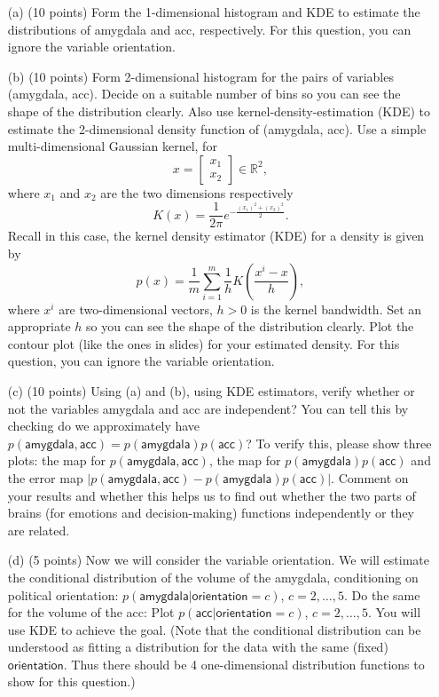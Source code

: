 \documentclass[twoside,12pt]{article}
\begin{document}
 \begin{enumerate}
 
 
 \item[(a)] (10 points) Form the 1-dimensional histogram and KDE to estimate the distributions of \textsf{amygdala} and \textsf{acc}, respectively. For this question, you can ignore the variable \textsf{orientation}.
 
 
 \item[(b)] (10 points) Form 2-dimensional histogram for the pairs of variables (\textsf{amygdala}, \textsf{acc}). Decide on a suitable number of bins so you can see the shape of the distribution clearly. Also use kernel-density-estimation (KDE) to estimate the 2-dimensional density function of (\textsf{amygdala}, \textsf{acc}). Use a simple multi-dimensional Gaussian kernel, for \[x = \begin{bmatrix}x_1\\x_2\end{bmatrix}\in \mathbb R^2,\] where $x_1$ and $x_2$ are the two dimensions respectively \[K(x) = \frac{1}{2\pi} e^{-\frac{(x_1)^2 + (x_2)^2}{2}}.\] Recall in this case, the kernel density estimator (KDE) for a density is given by
 \[
 p(x) = \frac 1 m \sum_{i=1}^m \frac 1 h
 K\left(
 \frac{x^i - x}{h}
 \right),
 \]
where $x^i$ are two-dimensional vectors, $h >0$ is the kernel bandwidth. Set an appropriate $h$ so you can see the shape of the distribution clearly. Plot the contour plot (like the ones in slides) for your estimated density. For this question, you can ignore the variable \textsf{orientation}. 

 \item[(c)] (10 points) Using (a) and (b), using KDE estimators, verify whether or not  the variables \textsf{amygdala} and \textsf{acc} are independent? You can tell this by checking do we approximately have $p( \textsf{amygdala},  \textsf{acc}) = p( \textsf{amygdala}) p(\textsf{acc})$? To verify this, please show three plots: the map for $p( \textsf{amygdala},  \textsf{acc})$, the map for $p( \textsf{amygdala}) p(\textsf{acc})$ and the error map $|p( \textsf{amygdala},  \textsf{acc}) - p( \textsf{amygdala}) p(\textsf{acc})|$. Comment on your results and whether this helps us to find out whether the two parts of brains (for emotions and decision-making) functions independently or they are related. 

 \item[(d)] (5 points) Now we will consider the variable \textsf{orientation}. We will estimate the conditional distribution of the volume of the \textsf{amygdala}, conditioning on political \textsf{orientation}: $p(\textsf{amygdala}|\textsf{orientation}=c)$, $c = 2, \ldots, 5$. Do the same for the volume of the \textsf{acc}: Plot $p(\textsf{acc}|\textsf{orientation}=c)$, $c = 2, \ldots, 5$. You will use KDE to achieve the goal. (Note that the conditional distribution can be understood as fitting a distribution for the data with the same (fixed) $\textsf{orientation}$. Thus there should be 4 one-dimensional distribution functions to show for this question.) 
 

\end{enumerate}
\end{document}
